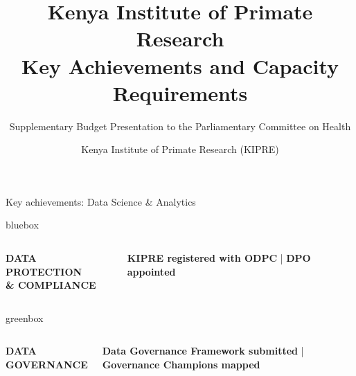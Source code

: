 \documentclass[aspectratio=169,11pt]{beamer}
\title{%
    \textbf{Kenya Institute of Primate Research}\\[0.2em]
    \large Key Achievements and Capacity Requirements
}
\subtitle{%
    Supplementary Budget Presentation to the Parliamentary Committee on Health
}
\author{%
    Kenya Institute of Primate Research (KIPRE)
}
\institute{%
    \textbf{2026}
}
\date{}
\begin{document}

\begin{frame}{Key achievements: Data Science \& Analytics}

\vspace{-0.45em}


\begin{beamercolorbox}[
    wd=\textwidth,
    sep=0.16cm,
    rounded=true
]{bluebox}

\begin{columns}[c,totalwidth=\textwidth]

\textcolor{execblue}{\textbf{DATA PROTECTION}}\\
\textcolor{execblue}{\textbf{\& COMPLIANCE}}

\raggedright
{\normalsize
\textbf{KIPRE registered with ODPC} | 
\textbf{DPO appointed}
}

\end{columns}

\end{beamercolorbox}

\vspace{0.12cm}


\begin{beamercolorbox}[
    wd=\textwidth,
    sep=0.16cm,
    rounded=true
]{greenbox}

\begin{columns}[c,totalwidth=\textwidth]

\textcolor{execgreen}{\textbf{DATA GOVERNANCE}}

\raggedright
{\normalsize
\textbf{Data Governance Framework submitted}
| 
\textbf{Governance Champions mapped}
}

\end{columns}

\end{beamercolorbox}

\vspace{0.12cm}



\end{frame}
\end{document}
